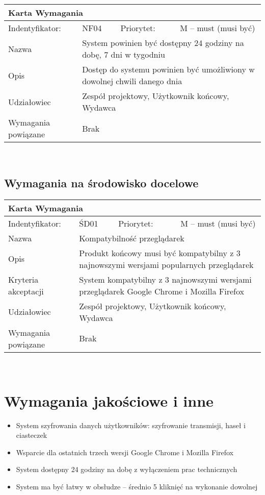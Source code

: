\documentclass[a4paper,11pt]{report}
\begin{document}
		\begin{tabular}{|p{3cm}|p{2cm}|p{2cm}|p{6cm}|}
		\hline
		\multicolumn{4}{|p{12 cm}|}{Karta Wymagania}\\
		\hline
		Indentyfikator: & NF04 & Priorytet: & M – must (musi być)\\
		\hline
		Nazwa & \multicolumn{3}{|p{10 cm}|}{System powinien być dostępny 24 godziny na dobę, 7 dni w tygodniu}\\
		\hline
		Opis & \multicolumn{3}{|p{10 cm}|}{Dostęp do systemu powinien być umożliwiony w dowolnej chwili danego dnia}\\
		\hline
		Udziałowiec & \multicolumn{3}{|p{10 cm}|}{Zespół projektowy, Użytkownik końcowy, Wydawca}\\
		\hline
		Wymagania powiązane & \multicolumn{3}{|p{10 cm}|}{Brak}\\
		\hline
		\end{tabular}\\
	\subsection {Wymagania na środowisko docelowe}
	\begin{tabular}{|p{3cm}|p{2cm}|p{2cm}|p{6cm}|}
		\hline
		\multicolumn{4}{|p{12 cm}|}{Karta Wymagania}\\
		\hline
		Indentyfikator: & ŚD01 & Priorytet: & M – must (musi być)\\
		\hline
		Nazwa & \multicolumn{3}{|p{10 cm}|}{Kompatybilność przeglądarek}\\
		\hline
		Opis & \multicolumn{3}{|p{10 cm}|}{Produkt końcowy musi być kompatybilny z 3 najnowszymi wersjami popularnych przeglądarek}\\
		\hline
		Kryteria akceptacji & \multicolumn{3}{|p{10 cm}|}{System kompatybilny z 3 najnowszymi wersjami przeglądarek Google Chrome i Mozilla Firefox}\\
		\hline
		Udziałowiec & \multicolumn{3}{|p{10 cm}|}{Zespół projektowy, Użytkownik końcowy, Wydawca}\\
		\hline
		Wymagania powiązane & \multicolumn{3}{|p{10 cm}|}{Brak}\\
		\hline
		\end{tabular}\\
	\section {Wymagania jakościowe i inne}
	\begin{itemize}
		\item System szyfrowania danych użytkowników: szyfrowanie transmisji, haseł i ciasteczek
		\item Wsparcie dla ostatnich trzech wersji Google Chrome i Mozilla Firefox
		\item System dostępny 24 godziny na dobę z wyłączeniem prac technicznych
		\item System ma być łatwy w obsłudze – średnio 5 kliknięć na wykonanie dowolnej 
	\end{itemize}
\end{document}
